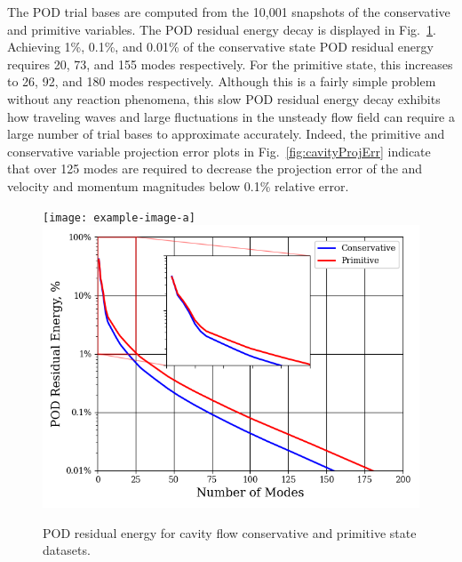 The POD trial bases are computed from the 10,001 snapshots of the conservative and primitive variables. The POD residual energy decay is displayed in Fig.~\ref{fig:cavityPODEnergy}. Achieving 1\%, 0.1\%, and 0.01\% of the conservative state POD residual energy requires 20, 73, and 155 modes respectively. For the primitive state, this increases to 26, 92, and 180 modes respectively. Although this is a fairly simple problem without any reaction phenomena, this slow POD residual energy decay exhibits how traveling waves and large fluctuations in the unsteady flow field can require a large number of trial bases to approximate accurately. Indeed, the primitive and conservative variable projection error plots in Fig.~\ref{fig:cavityProjErr} indicate that over 125 modes are required to decrease the projection error of the  and velocity and momentum magnitudes below 0.1\% relative error.

\begin{figure}
	\centering
	\ifdefined\DRAFT
		\texttt{[image: example-image-a]}
	\else
		\includegraphics[width=0.8\linewidth]{Chapters/CavityAndCVRC/Images/cavity/cavity_pod_energy_10ms.png}
	\fi
	\caption{\label{fig:cavityPODEnergy}POD residual energy for cavity flow conservative and primitive state datasets.}
\end{figure}

